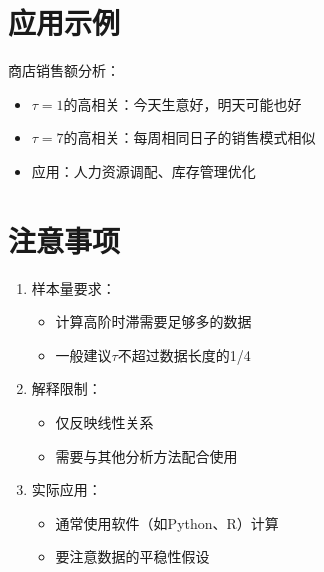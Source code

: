 \documentclass{article}
\begin{document}
\section{应用示例}

商店销售额分析：
\begin{itemize}
    \item $\tau=1$的高相关：今天生意好，明天可能也好
    \item $\tau=7$的高相关：每周相同日子的销售模式相似
    \item 应用：人力资源调配、库存管理优化
\end{itemize}

\section{注意事项}

\begin{enumerate}
    \item 样本量要求：
    \begin{itemize}
        \item 计算高阶时滞需要足够多的数据
        \item 一般建议$\tau$不超过数据长度的1/4
    \end{itemize}
    
    \item 解释限制：
    \begin{itemize}
        \item 仅反映线性关系
        \item 需要与其他分析方法配合使用
    \end{itemize}
    
    \item 实际应用：
    \begin{itemize}
        \item 通常使用软件（如Python、R）计算
        \item 要注意数据的平稳性假设
    \end{itemize}
\end{enumerate}
\end{document}
